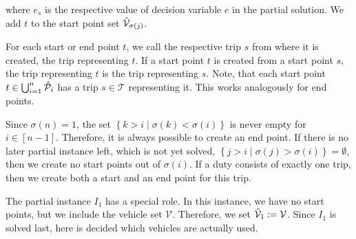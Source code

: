 where $e_s$ is the respective value of decision variable $e$ in the partial solution. We add $t$ to the start point set $\hat{\mathcal{V}}_{\sigma(j)}$.

For each start or end point $t$, we call the respective trip $s$ from where it is created, the trip representing $t$. If a start point $t$ is created from a start point $s$, the trip representing $t$ is the trip representing $s$. Note, that each start point ${t\in\bigcup_{i=1}^n\hat{\mathcal{P}}_i}$ has a trip ${s\in\mathcal{T}}$ representing it. This works analogously for end points.

\begin{remark}

Since $\sigma(n)=1$, the set ${\left\{k>i\mid\sigma(k)<\sigma(i)\right\}}$ is never empty for $i\in[n-1]$. Therefore, it is always possible to create an end point. If there is no later partial instance left, which is not yet solved, \ie ${\left\{j>i\mid\sigma(j)>\sigma(i)\right\}=\emptyset}$, then we create no start points out of $\sigma(i)$. If a duty consists of exactly one trip, then we create both a start and an end point for this trip.

\end{remark}

The partial instance $I_1$ has a special role. In this instance, we have no start points, but we include the vehicle set $\mathcal{V}$. Therefore, we set ${\hat{\mathcal{V}}_1:=\mathcal{V}}$. Since $I_1$ is solved last, here is decided which vehicles are actually used. 

